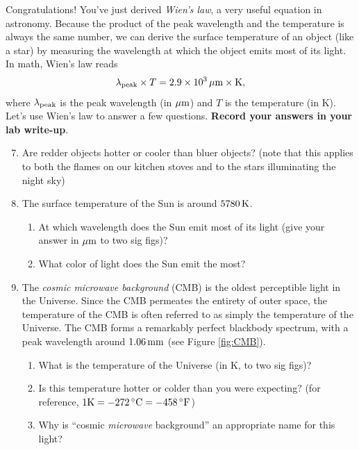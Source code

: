 \documentclass[11pt]{article}
\begin{document}
\medskip \noindent
Congratulations! You've just derived \textit{Wien's law}, a very useful equation in astronomy. Because the product of the peak wavelength and the temperature is always the same number, we can derive the surface temperature of an object (like a star) by measuring the wavelength at which the object emits most of its light. In math, Wien's law reads
\begin{equation}
    \lambda_{\rm peak} \times T = 2.9 \times 10^3 \, {\rm \mu m \times K},
\end{equation}
where $\lambda_{\rm peak}$ is the peak wavelength (in $\rm \mu m$) and $T$ is the temperature (in K). Let's use Wien's law to answer a few questions. \textbf{Record your answers in your lab write-up}.
\begin{enumerate}
    \setcounter{enumi}{6}
    
    \item Are redder objects hotter or cooler than bluer objects? (note that this applies to both the flames on our kitchen stoves and to the stars illuminating the night sky)
    
    \item The surface temperature of the Sun is around $5780 \, {\rm K}$. 
    \begin{enumerate}
        \item At which wavelength does the Sun emit most of its light (give your answer in $\rm \mu m$ to two sig figs)?
        \item What color of light does the Sun emit the most?
    \end{enumerate} 
    
    \item The \emph{cosmic microwave background} (CMB) is the oldest perceptible light in the Universe. Since the CMB permeates the entirety of outer space, the temperature of the CMB is often referred to as simply the temperature of the Universe. The CMB forms a remarkably perfect blackbody spectrum, with a peak wavelength around $1.06 \, {\rm mm}$ (see Figure \ref{fig:CMB}). 
    \begin{enumerate}
        \item What is the temperature of the Universe (in K, to two sig figs)?
        
        \item Is this temperature hotter or colder than you were expecting? (for reference, $\rm 1 K = -272 \, ^\circ C = -458 \, ^\circ F$)
        
        \item Why is ``cosmic \emph{microwave} background'' an appropriate name for this light? 
    \end{enumerate}
\end{enumerate}
\end{document}
